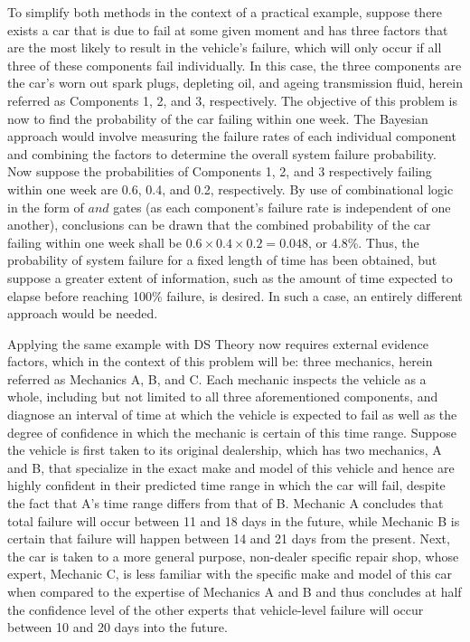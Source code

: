 \documentclass[12pt]{uthesis-v12}  %
\begin{document}
To simplify both methods in the context of a practical example, suppose there exists a car that is due to fail at some given moment and has three factors that are the most likely to result in the vehicle's failure, which will only occur if all three of these components fail individually. In this case, the three components are the car's worn out spark plugs, depleting oil, and ageing transmission fluid, herein referred as Components 1, 2, and 3, respectively. The objective of this problem is now to find the probability of the car failing within one week. The Bayesian approach would involve measuring the failure rates of each individual component and combining the factors to determine the overall system failure probability. Now suppose the probabilities of Components 1, 2, and 3 respectively failing within one week are 0.6, 0.4, and 0.2, respectively. By use of combinational logic in the form of $and$ gates (as each component's failure rate is independent of one another), conclusions can be drawn that the combined probability of the car failing within one week shall be $0.6 \times 0.4 \times 0.2 = 0.048$, or 4.8\%. Thus, the probability of system failure for a fixed length of time has been obtained, but suppose a greater extent of information, such as the amount of time expected to elapse before reaching 100\% failure, is desired. In such a case, an entirely different approach would be needed. 

Applying the same example with DS Theory now requires external evidence factors, which in the context of this problem will be: three mechanics, herein referred as Mechanics A, B, and C. Each mechanic inspects the vehicle as a whole, including but not limited to all three aforementioned components, and diagnose an interval of time at which the vehicle is expected to fail as well as the degree of confidence in which the mechanic is certain of this time range. Suppose the vehicle is first taken to its original dealership, which has two mechanics, A and B, that specialize in the exact make and model of this vehicle and hence are highly confident in their predicted time range in which the car will fail, despite the fact that A's time range differs from that of B. Mechanic A concludes that total failure will occur between 11 and 18 days in the future, while Mechanic B is certain that failure will happen between 14 and 21 days from the present. Next, the car is taken to a more general purpose, non-dealer specific repair shop, whose expert, Mechanic C, is less familiar with the specific make and model of this car when compared to the expertise of Mechanics A and B and thus concludes at half the confidence level of the other experts that vehicle-level failure will occur between 10 and 20 days into the future. 
\end{document}

